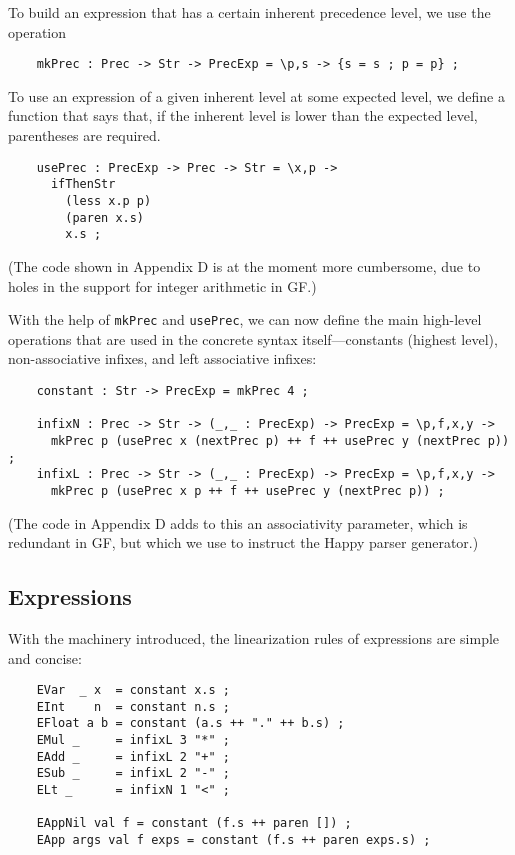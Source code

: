 \documentclass[12pt]{article}
\begin{document}
To build an expression that has a certain inherent precedence level,
we use the operation
\begin{verbatim}
    mkPrec : Prec -> Str -> PrecExp = \p,s -> {s = s ; p = p} ;
\end{verbatim}
To use an expression of a given inherent level at some expected level,
we define a function that says that, if the inherent level is lower
than the expected level, parentheses are required. 
\begin{verbatim}
    usePrec : PrecExp -> Prec -> Str = \x,p ->
      ifThenStr
        (less x.p p) 
        (paren x.s)
        x.s ;
\end{verbatim}
(The code shown in Appendix D is at the moment more cumbersome,
due to holes in the support for integer arithmetic in GF.)

With the help of \texttt{mkPrec} and \texttt{usePrec},
we can now define the main high-level operations that are
used in the concrete syntax itself---constants (highest level),
non-associative infixes, and left associative infixes:
\begin{verbatim}
    constant : Str -> PrecExp = mkPrec 4 ;

    infixN : Prec -> Str -> (_,_ : PrecExp) -> PrecExp = \p,f,x,y ->
      mkPrec p (usePrec x (nextPrec p) ++ f ++ usePrec y (nextPrec p)) ;
    infixL : Prec -> Str -> (_,_ : PrecExp) -> PrecExp = \p,f,x,y ->
      mkPrec p (usePrec x p ++ f ++ usePrec y (nextPrec p)) ;
\end{verbatim}
(The code in Appendix D adds to this an associativity parameter, 
which is redundant in GF, but which we use to instruct the Happy 
parser generator.)


\subsection{Expressions}

With the machinery introduced, the linearization rules of expressions
are simple and concise:
\begin{verbatim}
    EVar  _ x  = constant x.s ;
    EInt    n  = constant n.s ;
    EFloat a b = constant (a.s ++ "." ++ b.s) ;
    EMul _     = infixL 3 "*" ;
    EAdd _     = infixL 2 "+" ;
    ESub _     = infixL 2 "-" ;
    ELt _      = infixN 1 "<" ;

    EAppNil val f = constant (f.s ++ paren []) ;
    EApp args val f exps = constant (f.s ++ paren exps.s) ;
\end{verbatim}
\end{document}
